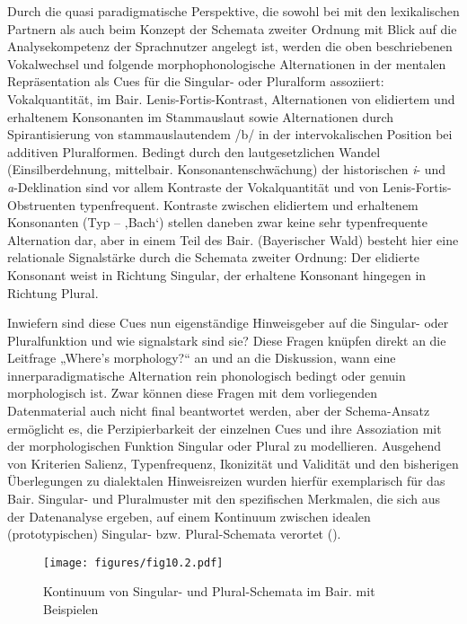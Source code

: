 Durch die quasi paradigmatische Perspektive, die sowohl bei \citet{Köpcke1993} mit den lexikalischen Partnern als auch beim Konzept der Schemata zweiter Ordnung mit Blick auf die Analysekompetenz der Sprachnutzer angelegt ist, werden die oben beschriebenen Vokalwechsel und folgende morphophonologische Alternationen in der mentalen Repräsentation als Cues für die Singular- oder Pluralform assoziiert: Vokalquantität, im Bair. Lenis-Fortis-Kontrast, Alternationen von elidiertem und erhaltenem Konsonanten im Stammauslaut sowie Alternationen durch Spirantisierung von stammauslautendem /b/ in der intervokalischen Position bei additiven Pluralformen. Bedingt durch den lautgesetzlichen Wandel (Einsilberdehnung, mittelbair. Konsonantenschwächung) der historischen \textit{i}{}- und \textit{a}{}-Deklination sind vor allem Kontraste der Vokalquantität und von Lenis-Fortis-Obstruenten typenfrequent. Kontraste zwischen elidiertem und erhaltenem Konsonanten (Typ  --  ‚Bach‘) stellen daneben zwar keine sehr typenfrequente Alternation dar, aber in einem Teil des Bair. (Bayerischer Wald) besteht hier eine relationale Signalstärke durch die Schemata zweiter Ordnung: Der elidierte Konsonant weist in Richtung Singular, der erhaltene Konsonant hingegen in Richtung Plural.

Inwiefern sind diese Cues nun eigenständige Hinweisgeber auf die Singular- oder Pluralfunktion und wie signalstark sind sie? Diese Fragen knüpfen direkt an die Leitfrage „Where’s morphology?“ an und an die Diskussion, wann eine innerparadigmatische Alternation rein phonologisch bedingt oder genuin morphologisch ist. Zwar können diese Fragen mit dem vorliegenden Datenmaterial auch nicht final beantwortet werden, aber der Schema-Ansatz ermöglicht es, die Perzipierbarkeit der einzelnen Cues und ihre Assoziation mit der morphologischen Funktion Singular oder Plural zu modellieren. Ausgehend von  Kriterien Salienz, Typenfrequenz, Ikonizität und Validität und den bisherigen Überlegungen zu dialektalen Hinweisreizen wurden hierfür exemplarisch für das Bair. Singular- und Pluralmuster mit den spezifischen Merkmalen, die sich aus der Datenanalyse ergeben, auf einem Kontinuum zwischen idealen (prototypischen) Singular- bzw. Plural-Schemata verortet ().\largerpage[-1]


\begin{figure}
\texttt{[image: figures/fig10.2.pdf]}
\caption{\label{fig:10.2}Kontinuum von Singular- und Plural-Schemata im Bair. mit Beispielen}
\label{fig:20}
\end{figure}

